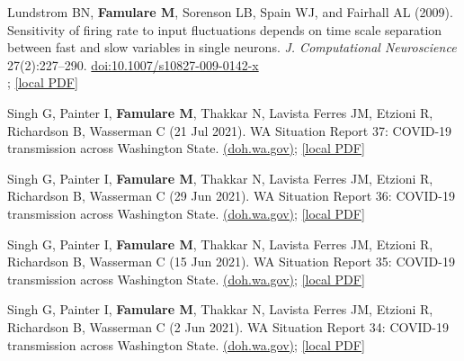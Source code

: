 \documentclass{article}
\begin{document}
\begin{llist}
\begin{items}
\item[{[1]}] Lundstrom BN, \textbf{Famulare M}, Sorenson LB, Spain WJ, and Fairhall AL (2009).  Sensitivity of firing rate to input fluctuations depends on time scale separation between fast and slow variables in single neurons.  \emph{J. Computational Neuroscience} 27(2):227--290. \href{https://doi.org/10.1007/s10827-009-0142-x}{doi:10.1007/s10827-009-0142-x} \\; \href{https://famulare.github.io/assets/publication-mirror/journal-01.pdf}{[local PDF]}

\end{items}

  \vspace{4pt}

\begin{items}
	
	\item[{[53]}] Singh G, Painter I, \textbf{Famulare M}, Thakkar N,  Lavista Ferres JM, Etzioni R, Richardson B, Wasserman C (21 Jul 2021). WA Situation Report 37: COVID-19 transmission across Washington State. \href{https://www.doh.wa.gov/Portals/1/Documents/1600/coronavirus/data-tables/820-114-SituationReport-20210721.pdf}{(doh.wa.gov)}; \href{https://famulare.github.io/assets/publication-mirror/820-114-SituationReport-20210721.pdf}{[local PDF]}
	
	\item[{[52]}] Singh G, Painter I, \textbf{Famulare M}, Thakkar N,  Lavista Ferres JM, Etzioni R, Richardson B, Wasserman C (29 Jun 2021). WA Situation Report 36: COVID-19 transmission across Washington State. \href{https://www.doh.wa.gov/Portals/1/Documents/1600/coronavirus/data-tables/820-114-SituationReport-20210630.pdf}{(doh.wa.gov)}; \href{https://famulare.github.io/assets/publication-mirror/820-114-SituationReport-20210630.pdf}{[local PDF]}
	
	\item[{[51]}] Singh G, Painter I, \textbf{Famulare M}, Thakkar N,  Lavista Ferres JM, Etzioni R, Richardson B, Wasserman C (15 Jun 2021). WA Situation Report 35: COVID-19 transmission across Washington State. \href{https://www.doh.wa.gov/Portals/1/Documents/1600/coronavirus/data-tables/820-114-SituationReport-20210616.pdf}{(doh.wa.gov)}; \href{https://famulare.github.io/assets/publication-mirror/820-114-SituationReport-20210616.pdf}{[local PDF]}
		
	\item[{[50]}] Singh G, Painter I, \textbf{Famulare M}, Thakkar N,  Lavista Ferres JM, Etzioni R, Richardson B, Wasserman C (2 Jun 2021). WA Situation Report 34: COVID-19 transmission across Washington State. \href{https://www.doh.wa.gov/Portals/1/Documents/1600/coronavirus/data-tables/820-114-SituationReport-20210603.pdf}{(doh.wa.gov)}; \href{https://famulare.github.io/assets/publication-mirror/820-114-SituationReport-20210603.pdf}{[local PDF]}
	

\end{items}
\end{llist}
\end{document}
